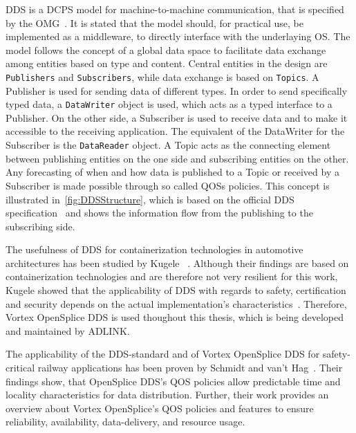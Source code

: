 \Gls*{DDS} is a \gls*{DCPS} model for machine-to-machine communication, that is specified by the \gls*{OMG}~\cite{omgDDSspec}.
It is stated that the model should, for practical use, be implemented as a middleware, to directly interface with the underlaying \gls*{OS}.
The model follows the concept of a global data space to facilitate data exchange among entities based on type and content.
Central entities in the design are \texttt{Publishers} and \texttt{Subscribers}, while data exchange is based on \texttt{Topics}.
A Publisher is used for sending data of different types.
In order to send specifically typed data, a \texttt{DataWriter} object is used, which acts as a typed interface to a Publisher.
On the other side, a Subscriber is used to receive data and to make it accessible to the receiving application.
The equivalent of the DataWriter for the Subscriber is the \texttt{DataReader} object.
A Topic acts as the connecting element between publishing entities on the one side and subscribing entities on the other.
Any forecasting of when and how data is published to a Topic or received by a Subscriber is made possible through so called \glspl*{QOS} policies.
This concept is illustrated in~\autoref{fig:DDSStructure}, which is based on the official \gls*{DDS} specification~\cite{omgDDSspec} and shows the information flow from the publishing to the subscribing side.

The usefulness of \gls*{DDS} for containerization technologies in automotive architectures has been studied by Kugele \etal~\cite{KugeleDataCentricForAuto}.
Although their findings are based on containerization technologies and are therefore not very resilient for this work, Kugele \etal showed that the applicability of \gls*{DDS} with regards to safety, certification and security depends on the actual implementation's characteristics~\cite{KugeleDataCentricForAuto}.
Therefore, Vortex OpenSplice DDS is used thoughout this thesis, which is being developed and maintained by ADLINK.

The applicability of the \gls*{DDS}-standard and of Vortex OpenSplice \gls*{DDS} for safety-critical railway applications has been proven by Schmidt and van't Hag~\cite{SchmidtMissionCriticalChallenges}.
Their findings show, that OpenSplice \gls*{DDS}'s \gls*{QOS} policies allow predictable time and locality characteristics for data distribution.
Further, their work provides an overview about Vortex OpenSplice's \gls*{QOS} policies and features to ensure reliability, availability, data-delivery, and resource usage.

